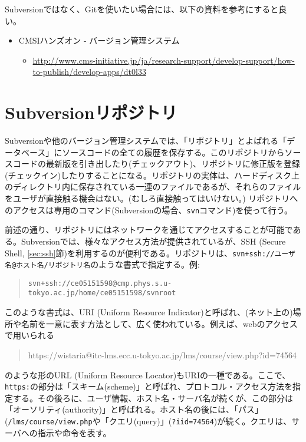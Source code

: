 Subversionではなく、Gitを使いたい場合には、以下の資料を参考にすると良い。
\begin{itemize}
\item {CMSIハンズオン - バージョン管理システム}
  \begin{itemize}
  \item {\footnotesize \url{http://www.cms-initiative.jp/ja/research-support/develop-support/how-to-publish/develop-apps/dt0l33}}
  \end{itemize}
\end{itemize}

\section{Subversionリポジトリ}

Subversionや他のバージョン管理システムでは、「リポジトリ」とよばれる「データベース」にソースコードの全ての履歴を保存する。このリポジトリからソースコードの最新版を引き出したり(チェックアウト)、リポジトリに修正版を登録(チェックイン)したりすることになる。リポジトリの実体は、ハードディスク上のディレクトリ内に保存されている一連のファイルであるが、それらのファイルをユーザが直接触る機会はない。(むしろ直接触ってはいけない。) リポジトリへのアクセスは専用のコマンド(Subversionの場合、{\tt svn}コマンド)を使って行う。

前述の通り、リポジトリにはネットワークを通じてアクセスすることが可能である。Subversionでは、様々なアクセス方法が提供されているが、SSH (Secure Shell, \ref{sec:ssh}節)を利用するのが便利である。リポジトリは、{\tt svn+ssh://ユーザ名@ホスト名/リポジトリ名}のような書式で指定する。例:
\begin{quote}
  {\tt svn+ssh://ce05151598@cmp.phys.s.u-tokyo.ac.jp/home/ce05151598/svnroot}
\end{quote}

このような書式は、URI (Uniform Resource Indicator)と呼ばれ、(ネット上の)場所や名前を一意に表す方法として、広く使われている。例えば、webのアクセスで用いられる
\begin{quote}
  {{https://wistaria@itc-lms.ecc.u-tokyo.ac.jp/lms/course/view.php?id=74564}}
\end{quote}
のような形のURL (Uniform Resource Locator)もURIの一種である。ここで、{\tt https:}の部分は「スキーム(scheme)」と呼ばれ、プロトコル・アクセス方法を指定する。その後ろに、ユーザ情報、ホスト名・サーバ名が続くが、この部分は「オーソリティ(authority)」と呼ばれる。ホスト名の後には、「パス」({\tt /lms/course/view.php}や「クエリ(query)」({\tt ?iid=74564})が続く。クエリは、サーバへの指示や命令を表す。

